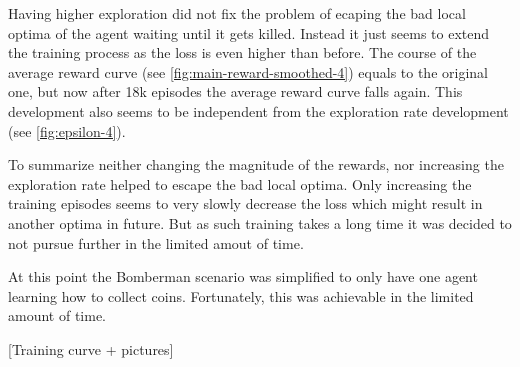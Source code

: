 Having higher exploration did not fix the problem of ecaping the bad local optima of the agent waiting until it gets killed. Instead it just seems to extend the training process as the loss is even higher than before. The course of the average reward curve (see \autoref{fig:main-reward-smoothed-4}) equals to the original one, but now after 18k episodes the average reward curve falls again. This development also seems to be independent from the exploration rate development (see \autoref{fig:epsilon-4}). 

To summarize neither changing the magnitude of the rewards, nor increasing the exploration rate helped to escape the bad local optima. Only increasing the training episodes seems to very slowly decrease the loss which might result in another optima in future. But as such training takes a long time it was decided to not pursue further in the limited amout of time. 

At this point the Bomberman scenario was simplified to only have one agent learning how to collect coins. Fortunately, this was achievable in the limited amount of time. 

[Training curve + pictures]



